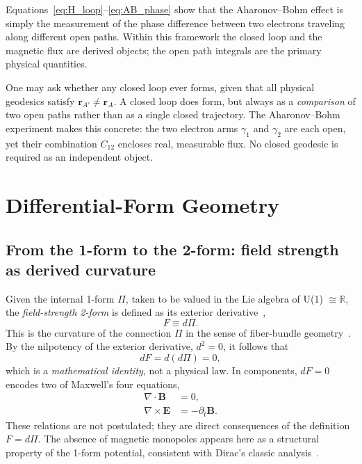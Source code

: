 \documentclass[%
 reprint, amsmath,amssymb, aps, prb, ]{revtex4-2}
\numberwithin{equation}{section}
\begin{document}
Equations~\eqref{eq:H_loop}--\eqref{eq:AB_phase} show that the Aharonov--Bohm effect is simply the measurement of the phase difference between two electrons traveling along different open paths. Within this framework the closed loop and the magnetic flux are derived objects; the open path integrals are the primary physical quantities.

One may ask whether any closed loop ever forms, given that all physical geodesics satisfy $\mathbf{r}_{A'}\neq\mathbf{r}_A$. A closed loop does form, but always as a \emph{comparison} of two open paths rather than as a single closed trajectory. The Aharonov--Bohm experiment makes this concrete: the two electron arms $\gamma_1$ and $\gamma_2$ are each open, yet their combination $C_{12}$ encloses real, measurable flux. No closed geodesic is required as an independent object.

\section{Differential-Form Geometry}
\label{sec:geometry}

\subsection{From the 1-form to the 2-form: field strength as derived curvature}

Given the internal 1-form $\Pi$, taken to be valued in the Lie algebra of U(1) $\cong \mathbb{R}$, the \emph{field-strength 2-form} is defined as its exterior derivative~\cite{Nakahara2003,KobayashiNomizu1963},
\begin{equation}
F \equiv d\Pi.
\label{eq:F_def}
\end{equation}
This is the curvature of the connection $\Pi$ in the sense of fiber-bundle geometry~\cite{WuYang1975}. By the nilpotency of the exterior derivative, $d^2 = 0$, it follows that
\begin{equation}
dF = d(d\Pi) = 0,
\label{eq:dF_zero}
\end{equation}
which is a \emph{mathematical identity}, not a physical law. In components, $dF=0$ encodes two of Maxwell's four equations,
\begin{align}
\nabla\cdot\mathbf{B} &= 0, \label{eq:divB}\\
\nabla\times\mathbf{E} &= -\partial_t\mathbf{B}. \label{eq:Faraday_diff}
\end{align}
These relations are not postulated; they are direct consequences of the definition $F = d\Pi$. The absence of magnetic monopoles appears here as a structural property of the 1-form potential, consistent with Dirac's classic analysis~\cite{Dirac1931}.
\end{document}
